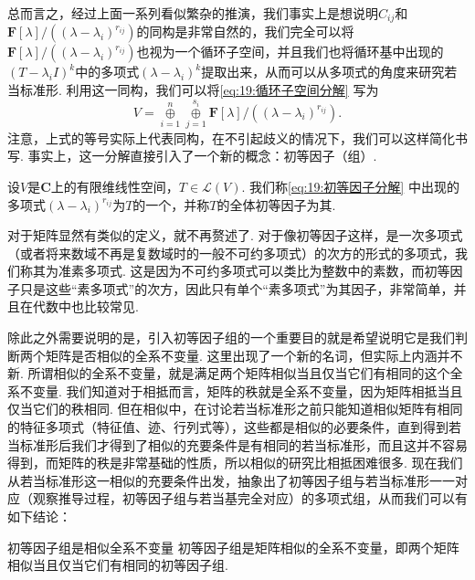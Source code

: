 总而言之，经过上面一系列看似繁杂的推演，我们事实上是想说明$C_{ij}$和$\mathbf{F}[\lambda]/((\lambda-\lambda_i)^{r_{ij}})$的同构是非常自然的，我们完全可以将$\mathbf{F}[\lambda]/((\lambda-\lambda_i)^{r_{ij}})$也视为一个循环子空间，并且我们也将循环基中出现的$(T-\lambda_i I)^k$中的多项式$(\lambda-\lambda_i)^k$提取出来，从而可以从多项式的角度来研究若当标准形. 利用这一同构，我们可以将\autoref{eq:19:循环子空间分解} 写为
\begin{equation} \label{eq:19:初等因子分解}
    V=\mathop{\oplus}\limits_{i=1}^n\mathop{\oplus}\limits_{j=1}^{s_i} \mathbf{F}[\lambda]/((\lambda-\lambda_i)^{r_{ij}}).
\end{equation}
注意，上式的等号实际上代表同构，在不引起歧义的情况下，我们可以这样简化书写. 事实上，这一分解直接引入了一个新的概念：初等因子（组）.
\begin{definition}{}{}
    设$V$是$\mathbf{C}$上的有限维线性空间，$T\in\mathcal{L}(V)$. 我们称\autoref{eq:19:初等因子分解} 中出现的多项式$(\lambda-\lambda_i)^{r_{ij}}$为$T$的一个，并称$T$的全体初等因子为其.
\end{definition}

对于矩阵显然有类似的定义，就不再赘述了. 对于像初等因子这样，是一次多项式（或者将来数域不再是复数域时的一般不可约多项式）的次方的形式的多项式，我们称其为准素多项式. 这是因为不可约多项式可以类比为整数中的素数，而初等因子只是这些``素多项式''的次方，因此只有单个``素多项式''为其因子，非常简单，并且在代数中也比较常见.

除此之外需要说明的是，引入初等因子组的一个重要目的就是希望说明它是我们判断两个矩阵是否相似的全系不变量. 这里出现了一个新的名词，但实际上内涵并不新. 所谓相似的全系不变量，就是满足两个矩阵相似当且仅当它们有相同的这个全系不变量. 我们知道对于相抵而言，矩阵的秩就是全系不变量，因为矩阵相抵当且仅当它们的秩相同. 但在相似中，在讨论若当标准形之前只能知道相似矩阵有相同的特征多项式（特征值、迹、行列式等），这些都是相似的必要条件，直到得到若当标准形后我们才得到了相似的充要条件是有相同的若当标准形，而且这并不容易得到，而矩阵的秩是非常基础的性质，所以相似的研究比相抵困难很多. 现在我们从若当标准形这一相似的充要条件出发，抽象出了初等因子组与若当标准形一一对应（观察推导过程，初等因子组与若当基完全对应）的多项式组，从而我们可以有如下结论：

\begin{theorem}{}{初等因子组是相似全系不变量}
    初等因子组是矩阵相似的全系不变量，即两个矩阵相似当且仅当它们有相同的初等因子组.
\end{theorem}

